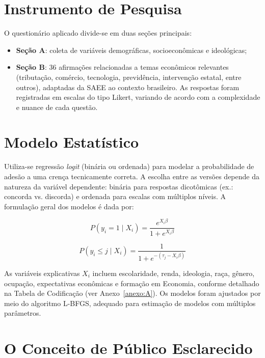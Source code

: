\section{Instrumento de Pesquisa}

O questionário aplicado divide-se em duas seções principais:
\begin{itemize}
    \item \textbf{Seção A}: coleta de variáveis demográficas, socioeconômicas e ideológicas;
    \item \textbf{Seção B}: 36 afirmações relacionadas a temas econômicos relevantes (tributação, comércio, tecnologia, previdência, intervenção estatal, entre outros), adaptadas da SAEE ao contexto brasileiro. As respostas foram registradas em escalas do tipo Likert, variando de acordo com a complexidade e nuance de cada questão.
\end{itemize}

\section{Modelo Estatístico}

Utiliza-se regressão \textit{logit} (binária ou ordenada) para modelar a probabilidade de adesão a uma crença tecnicamente correta. A escolha entre as versões depende da natureza da variável dependente: binária para respostas dicotômicas (ex.: concorda vs. discorda) e ordenada para escalas com múltiplos níveis. A formulação geral dos modelos é dada por:

\begin{equation}
P(y_i = 1 \mid X_i) = \frac{e^{X_i \beta}}{1 + e^{X_i \beta}}
\end{equation}

\begin{equation}
P(y_i \leq j \mid X_i) = \frac{1}{1 + e^{-(\tau_j - X_i \beta)}}
\end{equation}

As variáveis explicativas \(X_i\) incluem escolaridade, renda, ideologia, raça, gênero, ocupação, expectativas econômicas e formação em Economia, conforme detalhado na Tabela de Codificação (ver Anexo~\ref{anexo:A}). Os modelos foram ajustados por meio do algoritmo L-BFGS, adequado para estimação de modelos com múltiplos parâmetros.

\section{O Conceito de Público Esclarecido}

